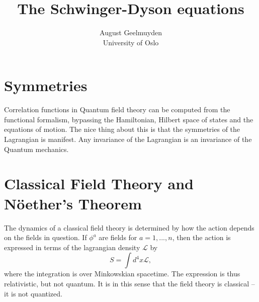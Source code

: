 \documentclass[twoside,utf8]{article}
\title{
\fontsize{22pt}{10pt}\selectfont
The Schwinger-Dyson equations
 } %
\author{
\large
August Geelmuyden
\\[2mm] %
\normalsize
University of Oslo \\ %
}
\date{}
\begin{document}
\maketitle %



\section{Symmetries}

Correlation functions in Quantum field theory can be computed from the functional formalism, bypassing the Hamiltonian, Hilbert space of states and the equations of motion. The nice thing about this is that the symmetries of the Lagrangian is manifest. Any invariance of the Lagrangian is an invariance of the Quantum mechanics.



\section{Classical Field Theory and N\"oether's Theorem}

The dynamics of a classical field theory is determined by how the action depends on the fields in question. If $\phi^a$ are fields for $a=1,...,n$, then
the action is expressed in terms of the lagrangian density $\mathcal{L}$ by
\[
S = \int d^4 x \mathcal{L},
\]
where the integration is over Minkowskian spacetime. The expression is thus relativistic, but not quantum. It is in this sense that the field theory is classical -- it is not quantized.
\end{document}
